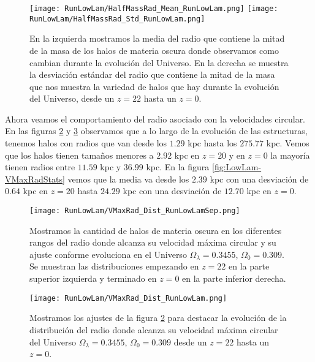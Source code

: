 \begin{figure}[H]
    \centering
    \texttt{[image: RunLowLam/HalfMassRad\_Mean\_RunLowLam.png]}
    \texttt{[image: RunLowLam/HalfMassRad\_Std\_RunLowLam.png]}
    \caption[Media y desviación estándar del radio de la mitad de la masa]{\footnotesize En la izquierda mostramos la media del radio que contiene la mitad de la masa de los halos de materia oscura donde observamos como cambian durante la evolución del Universo. En la derecha se muestra la desviación estándar del radio que contiene la mitad de la masa que nos muestra la variedad de halos que hay durante la evolución del Universo, desde un $z=22$ hasta un $z=0$.}
    \label{fig:LowLam-HalfMassRadStats}
\end{figure}

Ahora veamos el comportamiento del radio asociado con la velocidades circular. En las figuras \ref{fig:LowLam-VMaxRadDistSep} y \ref{fig:LowLam-VMaxRadDist} observamos que a lo largo de la evolución de las estructuras, tenemos halos con radios que van desde los $1.29$ kpc hasta los $275.77$ kpc. Vemos que los halos tienen tamaños menores a $2.92$ kpc en $z=20$ y en $z=0$ la mayoría tienen radios entre $11.59$ kpc y $36.99$ kpc. En la figura \ref{fig:LowLam-VMaxRadStats} vemos que la media va desde los $2.39$ kpc con una desviación de $0.64$ kpc en $z=20$ hasta $24.29$ kpc con una desviación de $12.70$ kpc en $z=0$.

\begin{figure}[H]
    \centering
    \texttt{[image: RunLowLam/VMaxRad\_Dist\_RunLowLamSep.png]}
    \caption[Radio donde se alcanza la velocidad máxima circular]{\footnotesize Mostramos la cantidad de halos de materia oscura en los diferentes rangos del radio donde alcanza su velocidad máxima circular y su ajuste conforme evoluciona en el Universo $\Omega_\lambda = 0.3455$, $\Omega_0 = 0.309$. Se muestran las distribuciones empezando en $z=22$ en la parte superior izquierda y terminado en $z=0$ en la parte inferior derecha.}
    \label{fig:LowLam-VMaxRadDistSep}
\end{figure}

\begin{figure}[H]
    \centering
    \texttt{[image: RunLowLam/VMaxRad\_Dist\_RunLowLam.png]}
    \caption[Distribución del radio donde se alcanza la velocidad máxima circular]{\footnotesize Mostramos los ajustes de la figura \ref{fig:LowLam-VMaxRadDistSep} para destacar la evolución de la distribución del radio donde alcanza su velocidad máxima circular del Universo $\Omega_\lambda = 0.3455$, $\Omega_0 = 0.309$ desde un $z=22$ hasta un $z=0$.}
    \label{fig:LowLam-VMaxRadDist}
\end{figure}

